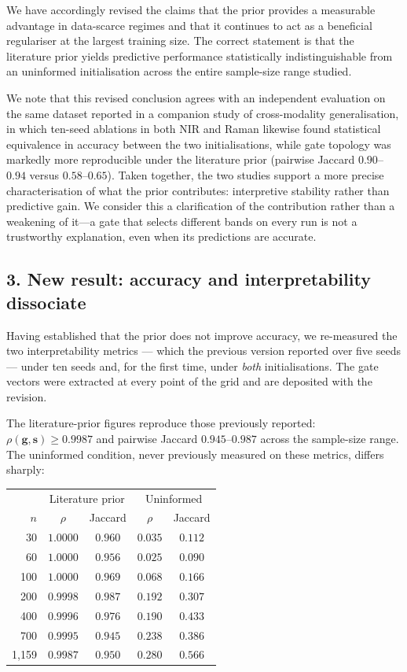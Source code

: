 We have accordingly revised the claims that the prior provides a measurable
advantage in data-scarce regimes and that it continues to act as a beneficial
regulariser at the largest training size. The correct statement is that the
literature prior yields predictive performance statistically indistinguishable
from an uninformed initialisation across the entire sample-size range studied.

We note that this revised conclusion agrees with an independent evaluation on
the same dataset reported in a companion study of cross-modality
generalisation, in which ten-seed ablations in both NIR and Raman likewise
found statistical equivalence in accuracy between the two initialisations,
while gate topology was markedly more reproducible under the literature prior
(pairwise Jaccard $0.90$--$0.94$ versus $0.58$--$0.65$). Taken together, the
two studies support a more precise characterisation of what the prior
contributes: interpretive stability rather than predictive gain. We consider
this a clarification of the contribution rather than a weakening of it---a
gate that selects different bands on every run is not a trustworthy
explanation, even when its predictions are accurate.

\subsection*{3. New result: accuracy and interpretability dissociate}

Having established that the prior does not improve accuracy, we re-measured
the two interpretability metrics --- which the previous version reported over
five seeds --- under ten seeds and, for the first time, under \emph{both}
initialisations. The gate vectors were extracted at every point of the grid
and are deposited with the revision.

The literature-prior figures reproduce those previously reported:
$\rho(\mathbf{g},\mathbf{s}) \geq 0.9987$ and pairwise Jaccard
$0.945$--$0.987$ across the sample-size range. The uninformed condition,
never previously measured on these metrics, differs sharply:

\begin{center}
\small
\begin{tabular}{r cc cc}
\hline
& \multicolumn{2}{c}{Literature prior} & \multicolumn{2}{c}{Uninformed} \\
$n$ & $\rho$ & Jaccard & $\rho$ & Jaccard \\
\hline
     30 & $1.0000$ & $0.960$ & $0.035$ & $0.112$ \\
     60 & $1.0000$ & $0.956$ & $0.025$ & $0.090$ \\
    100 & $1.0000$ & $0.969$ & $0.068$ & $0.166$ \\
    200 & $0.9998$ & $0.987$ & $0.192$ & $0.307$ \\
    400 & $0.9996$ & $0.976$ & $0.190$ & $0.433$ \\
    700 & $0.9995$ & $0.945$ & $0.238$ & $0.386$ \\
1{,}159 & $0.9987$ & $0.950$ & $0.280$ & $0.566$ \\
\hline
\end{tabular}
\end{center}

